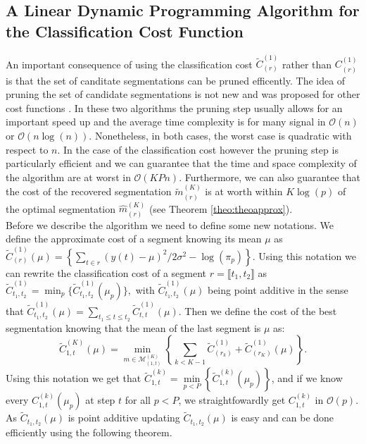 \documentclass[11pt]{llncs}
\begin{document}
\subsection{A Linear Dynamic Programming Algorithm for the Classification Cost Function}

An important consequence of using the classification cost $\widetilde{C}_{(r)}^{(1)}$ rather than ${C}_{(r)}^{(1)}$ is that the set of canditate segmentations 
can be pruned efficently. The idea of pruning the set of candidate segmentations
is not new and was proposed for other cost functions  \cite{killick_optimal_2011, rigaill_2010}.
In these two algorithms the pruning step usually allows for an important speed up and the average time complexity is for many signal in $\mathcal{O}(n)$ or  $\mathcal{O}(n\log(n))$. Nonetheless, in both cases, the worst case is quadratic with respect to $n$.
In the case of the classification cost however the pruning step is particularly 
efficient %
and we can guarantee that the time and space complexity of the algorithm are at worst in $\mathcal{O}(KPn)$. 
Furthermore, we can also guarantee that the cost of the recovered segmentation $\widetilde{m}_{(r)}^{(K)}$ is at worth within $K \log(p)$ of the optimal segmentation $\widehat{m}_{(r)}^{(K)}$ (see Theorem \ref{theo:theoapprox}). \\
\indent Before we describe the algorithm we need to define some new notations. We define the approximate cost of a segment knowing its mean $\mu$ as 
$ \widetilde{C}_{(r)}^{(1)}   (\mu) = \left\{ \sum_{t \in r} (y(t)- \mu)^2  /2 \sigma^2  - \log(\pi_p) \right\}.$ Using this notation we can rewrite the classification cost of a segment $r = \llbracket t_1, t_2 \rrbracket$ as $\widetilde{C}_{t_1, t_2}^{(1)}  = \min_p \{  \widetilde{C}_{t_1, t_2}^{(1)}  (\mu_p) \},$ with $\widetilde{C}_{t_1, t_2}^{(1)}  (\mu)$ being point additive in the sense that $\widetilde{C}_{t_1, t_2}^{(1)}  (\mu) = \underset{ t_1 \leq t \leq t_2}{\sum} \widetilde{C}_{t, t}^{(1)}  (\mu).$ Then we define the cost of the best segmentation knowing that the mean of the last segment is $\mu$ as:
$$\widetilde{C}_{1, t}^{(K)}(\mu) = \underset{{m \in \mathcal{M}^{(K)}_{(1, t)}}}{\min} \left\{ \sum_{k < K-1}  \widetilde{C}^{(1)}_{(r_k)}  + \widetilde{C}^{(1)}_{(r_K)}(\mu) \right\}.$$
Using this notation we get that $ \widetilde{C}_{1, t}^{(k)}  = \underset{p < P}{\min} \left\{ \widetilde{C}_{1, t}^{(k)}(\mu_p) \right\}$, and if we know every $C_{1, t}^{(k)}(\mu_p)$ at step $t$ for all $p< P$, we straightfowardly get $C_{1, t}^{(k)}$ in $\mathcal{O}(p)$. As $\widetilde{C}_{t_1, t_2} (\mu)$ is point additive 
updating $\widetilde{C}_{t_1, t_2} (\mu)$ is easy and can be done efficiently using the following theorem.
\end{document}

